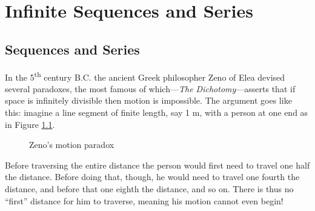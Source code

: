 \chapter{Infinite Sequences and Series}
\section{Sequences and Series}
In the 5\textsuperscript{th} century B.C. the ancient Greek philosopher Zeno of
Elea devised several paradoxes, the most famous of
which---\emph{The Dichotomy}---asserts that if space is infinitely divisible
then motion is impossible. The argument goes like this: imagine a line segment
of finite length, say 1 m, with a person at one end as in
Figure \ref{fig:zeno}.

\begin{figure}[ht]
\centering
{}
\caption[]{\enskip Zeno's motion paradox}
\label{fig:zeno}
\end{figure}

Before traversing the entire distance the person would first need to travel
one half the distance. Before doing that, though, he would need to travel one
fourth the distance, and before that one eighth the distance, and so on. There
is thus no ``first'' distance for him to traverse, meaning his motion cannot
even begin!

